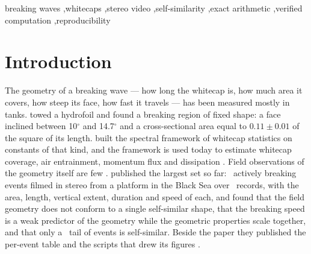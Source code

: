 \documentclass[preprint,11pt,authoryear]{elsarticle}
\begin{document}
\begin{frontmatter}
\begin{keyword}
breaking waves \sep whitecaps \sep stereo video \sep self-similarity \sep exact arithmetic \sep verified computation \sep reproducibility
\end{keyword}

\end{frontmatter}

\section{Introduction}\label{sec:intro}

The geometry of a breaking wave --- how long the whitecap is, how much area it covers, how steep its face, how fast it travels --- has been measured mostly in tanks. \citet{duncan1981} towed a hydrofoil and found a breaking region of fixed shape: a face inclined between 10$^\circ$ and 14.7$^\circ$ and a cross-sectional area equal to $0.11 \pm 0.01$ of the square of its length. \citet{phillips1985} built the spectral framework of whitecap statistics on constants of that kind, and the framework is used today to estimate whitecap coverage, air entrainment, momentum flux and dissipation \citep{gemmrich2008,banner2014,sutherland2013}. Field observations of the geometry itself are few \citep{kleiss2011}. \citet{guimaraes2026} published the largest set so far: \NEvents\ actively breaking events filmed in stereo from a platform in the Black Sea over \NRecords\ records, with the area, length, vertical extent, duration and speed of each, and found that the field geometry does not conform to a single self-similar shape, that the breaking speed is a weak predictor of the geometry while the geometric properties scale together, and that only a \SelfSimPrinted\ tail of events is self-similar. Beside the paper they published the per-event table and the scripts that drew its figures \citep{zenodo2026}.
\end{document}
